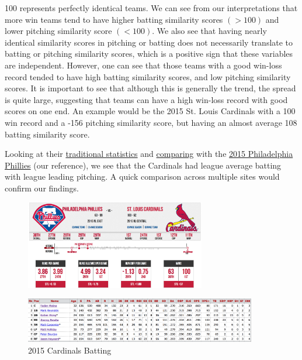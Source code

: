 \documentclass[12pt]{article}
\numberwithin{equation}{subsection}
\begin{document}
100 represents perfectly identical teams. We can see from our interpretations that more win teams tend to have higher batting similarity scores $(>100)$ and lower pitching similarity score $(<100)$. We also see that having nearly identical similarity scores in pitching or batting does not necessarily translate to batting or pitching similarity scores, which is a positive sign that these variables are independent. However, one can see that those teams with a good win-loss record tended to have high batting similarity scores, and low pitching similarity scores. It is important to see that although this is generally the trend, the spread is quite large, suggesting that teams can have a high win-loss record with good scores on one end. An example would be the 2015 St. Louis Cardinals with a 100 win record and a -156 pitching similarity score, but having an almost average 108 batting similarity score.

Looking at their \href{http://www.baseball-reference.com/teams/STL/2015.shtml}{traditional statistics} and \href{http://www.sportingcharts.com/mlb/teams/matchup/246-philadelphia-phillies-2015-vs-248-st.-louis-cardinals-2015/}{comparing} with the \href{http://www.baseball-reference.com/teams/PHI/2015.shtml}{2015 Philadelphia Phillies} (our reference), we see that the Cardinals had league average batting with league leading pitching. A quick comparison across multiple sites would confirm our findings.

\begin{figure}[H]
	\centering
	\includegraphics[width=0.7\textwidth]{infograph}
\end{figure}

\begin{figure}[H]
	\centering
	\includegraphics[width=0.9\textwidth]{infograph1}
    \caption{2015 Cardinals Batting}
\end{figure}
\end{document}
